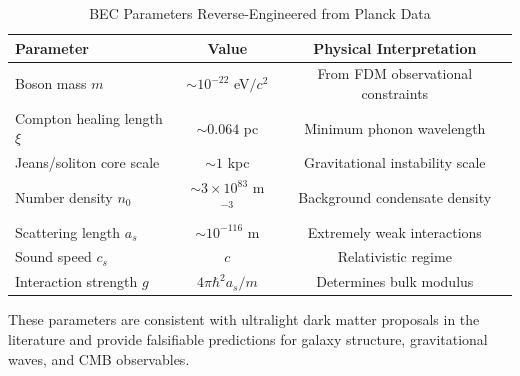 \documentclass[11pt,a4paper]{article}
\theoremstyle{definition}
\theoremstyle{remark}
\begin{document}
\begin{table}[H]
\centering
\caption{BEC Parameters Reverse-Engineered from Planck Data}
\label{tab:bec_parameters}
\begin{tabular}{@{}lcc@{}}
\toprule
\textbf{Parameter} & \textbf{Value} & \textbf{Physical Interpretation} \\
\midrule
Boson mass $m$ & $\sim 10^{-22}$ eV$/c^2$ & From FDM observational constraints \\
Compton healing length $\xi$ & $\sim 0.064$ pc & Minimum phonon wavelength \\
Jeans/soliton core scale & $\sim 1$ kpc & Gravitational instability scale \\
Number density $n_0$ & $\sim 3 \times 10^{83}$ m$^{-3}$ & Background condensate density \\
Scattering length $a_s$ & $\sim 10^{-116}$ m & Extremely weak interactions \\
Sound speed $c_s$ & $c$ & Relativistic regime \\
Interaction strength $g$ & $4\pi\hbar^2 a_s/m$ & Determines bulk modulus \\
\bottomrule
\end{tabular}
\end{table}

These parameters are consistent with ultralight dark matter proposals in the literature and provide falsifiable predictions for galaxy structure, gravitational waves, and CMB observables.
\end{document}
